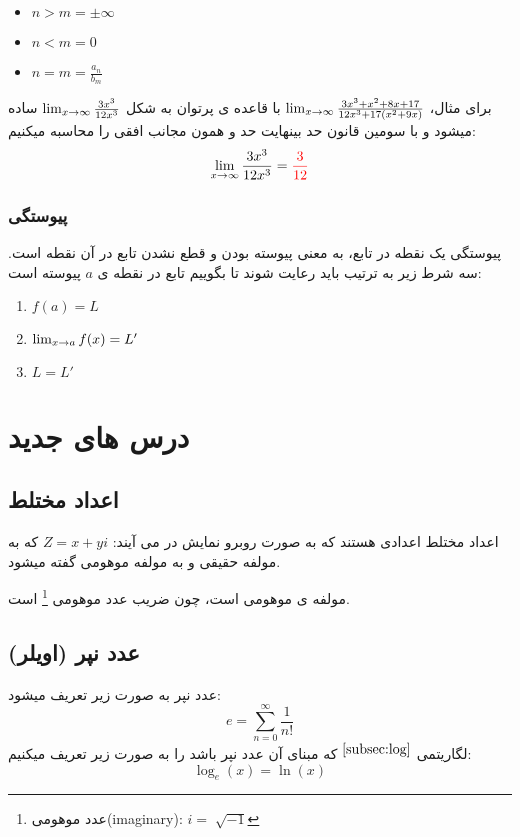 \documentclass[12pt, a4paper, oneside]{article}
\begin{document}
\begin{latin}
\begin{itemize}
    \item $n > m = \pm \infty$
    \item $n < m = 0$
    \item $n = m = \frac{ a_n }{ b_m }$
\end{itemize}
\end{latin}

برای مثال، $\lim_{x \to \infty} \frac{3x^3+x^2+8x+17}{12x^3+17(x^2+9x)}$ با قاعده ی پرتوان به شکل $\lim_{x \to \infty} \frac{3x^3}{12x^3}$ ساده میشود و با سومین قانون حد بینهایت حد و همون مجانب افقی را محاسبه میکنیم:
\[\lim_{x \to \infty} \frac{3x^3}{12x^3} = \textcolor{red}{ \frac{3}{12} }\]

\subsubsection{پیوستگی}
پیوستگی یک نقطه در تابع، به معنی پیوسته بودن و قطع نشدن تابع در آن نقطه است. سه شرط زیر به ترتیب باید رعایت شوند تا بگوییم تابع در نقطه ی $a$ پیوسته است:
\begin{latin}
\begin{enumerate}
    \item $f(a) = L$
    \item $\lim_{x \to a} f(x) = L'$
    \item $L = L'$
\end{enumerate}
\end{latin}

\section{درس های جدید}
\subsection{اعداد مختلط}
اعداد مختلط اعدادی هستند که به صورت روبرو نمایش در می آیند: $Z = x + yi$
که به  مولفه حقیقی و به  مولفه موهومی گفته میشود.

 مولفه ی موهومی است، چون ضریب عدد موهومی \footnote{عدد موهومی(imaginary): $i=\sqrt[]{-1}$} است.
\subsection{عدد نپر (اویلر)}
عدد نپر به صورت زیر تعریف میشود:
\[e=\sum_{n=0}^{\infty} \frac{1}{n!}\]
لگاریتمی
{$\overset{\ref{subsec:log}}{}$}
 که مبنای آن عدد نپر باشد را به صورت زیر تعریف میکنیم: 
\[\log_e (x) = \ln (x)\]
\end{document}
